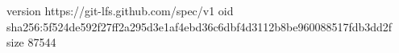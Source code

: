 version https://git-lfs.github.com/spec/v1
oid sha256:5f524de592f27ff2a295d3e1af4ebd36c6dbf4d3112b8be960088517fdb3dd2f
size 87544

